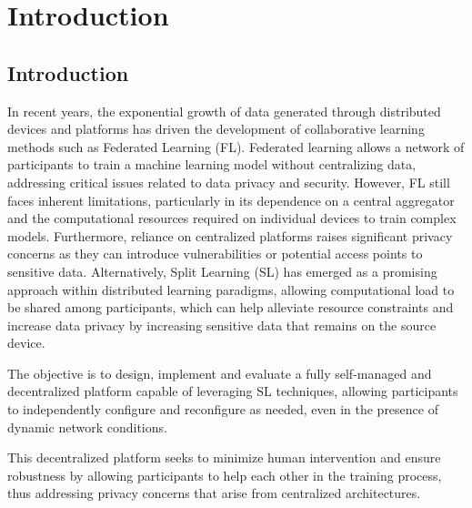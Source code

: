 
%

\chapter{Introduction}
\label{cha:introduction}


\epigraphfontsize{\small\itshape}
\setlength\epigraphwidth{12.5cm}
\setlength\epigraphrule{0pt}


\section{Introduction}
\label{sec:if_you_use_this_template}

In recent years, the exponential growth of data generated through distributed devices and platforms has driven the development of collaborative learning methods such as Federated Learning (FL). Federated learning allows a network of participants to train a machine learning model without centralizing data, addressing critical issues related to data privacy and security. However, FL still faces inherent limitations, particularly in its dependence on a central aggregator and the computational resources required on individual devices to train complex models. Furthermore, reliance on centralized platforms raises significant privacy concerns as they can introduce vulnerabilities or potential access points to sensitive data.
Alternatively, Split Learning (SL) has emerged as a promising approach within distributed learning paradigms, allowing computational load to be shared among participants, which can help alleviate resource constraints and increase data privacy by increasing sensitive data that remains on the source device.

The objective is to design, implement and evaluate a fully self-managed and decentralized platform capable of leveraging SL techniques, allowing participants to independently configure and reconfigure as needed, even in the presence of dynamic network conditions. 

This decentralized platform seeks to minimize human intervention and ensure robustness by allowing participants to help each other in the training process, thus addressing privacy concerns that arise from centralized architectures.

